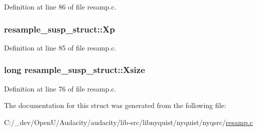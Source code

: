 Definition at line 86 of file resamp.\+c.

\subsubsection[{\texorpdfstring{Xp}{Xp}}]{ resample\+\_\+susp\+\_\+struct\+::\+Xp}\hypertarget{structresample__susp__struct_a67c94c5ef406c551d0230a6b95a21c24}{}\label{structresample__susp__struct_a67c94c5ef406c551d0230a6b95a21c24}


Definition at line 85 of file resamp.\+c.

\subsubsection[{\texorpdfstring{Xsize}{Xsize}}]{\setlength{\rightskip}{0pt plus 5cm}long resample\+\_\+susp\+\_\+struct\+::\+Xsize}\hypertarget{structresample__susp__struct_a2bb2e66895b2954fe66e32e49183c4cf}{}\label{structresample__susp__struct_a2bb2e66895b2954fe66e32e49183c4cf}


Definition at line 76 of file resamp.\+c.



The documentation for this struct was generated from the following file\+:\begin{DoxyCompactItemize}
\item 
C\+:/\+\_\+dev/\+Open\+U/\+Audacity/audacity/lib-\/src/libnyquist/nyquist/nyqsrc/\hyperlink{resamp_8c}{resamp.\+c}\end{DoxyCompactItemize}
